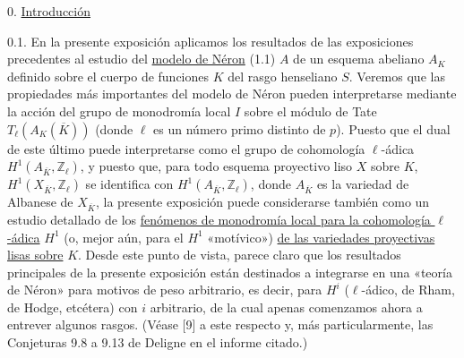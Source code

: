 0. \underline{Introducción}

0.1. En la presente exposición aplicamos los resultados de las
exposiciones precedentes al estudio del \underline{modelo de Néron}
(1.1) $A$ de un esquema abeliano $A_K$ definido sobre el cuerpo de
funciones $K$ del rasgo henseliano $S$. Veremos que las propiedades más
importantes del modelo de Néron pueden interpretarse mediante la acción
del grupo de monodromía local $I$ sobre el módulo de Tate
$T_\ell(A_K(\overline K))$ (donde $\ell$ es un número primo distinto de
$p$). Puesto que el dual de este último puede interpretarse como el grupo
de cohomología $\ell$-ádica $H^1(A_{\overline K},\mathbb Z_\ell)$, y
puesto que, para todo esquema proyectivo liso $X$ sobre $K$,
$H^1(X_{\overline K},\mathbb Z_\ell)$ se identifica con
$H^1(A_{\overline K},\mathbb Z_\ell)$, donde $A_{\overline K}$ es la
variedad de Albanese de $X_{\overline K}$, la presente exposición puede
considerarse también como un estudio detallado de los
\underline{fenómenos de monodromía local para la cohomología
$\ell$-ádica} $H^1$
(o, mejor aún, para el $H^1$ «motívico») \underline{de las variedades
proyectivas lisas sobre} $K$. Desde este punto de vista, parece claro
que los resultados principales de la presente exposición están
destinados a integrarse en una «teoría de Néron» para motivos de peso
arbitrario, es decir, para $H^i$ ($\ell$-ádico, de Rham, de Hodge,
etcétera) con $i$ arbitrario, de la cual apenas comenzamos ahora a
entrever algunos rasgos. (Véase [9] a este respecto y, más
particularmente, las Conjeturas 9.8 a 9.13 de Deligne en el informe
citado.)

